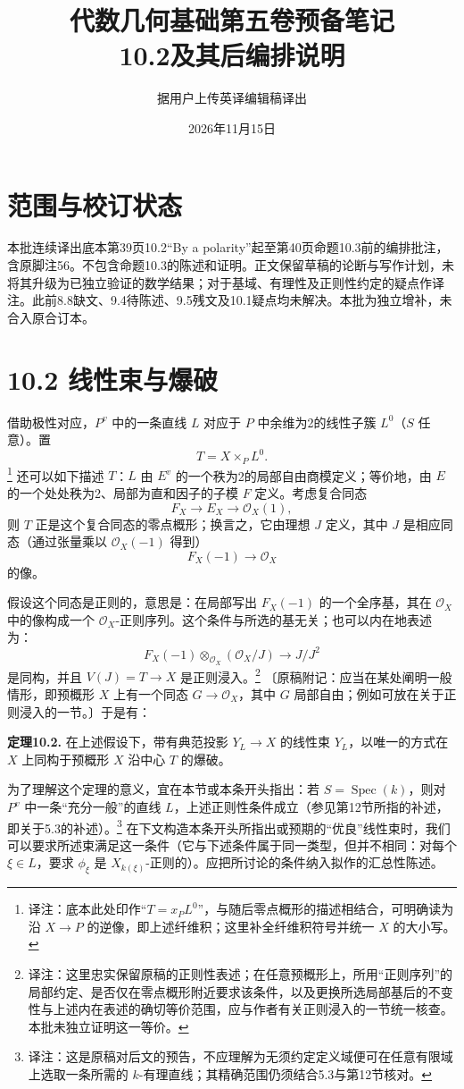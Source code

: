\documentclass[openany]{ctexbook}
\title{代数几何基础第五卷预备笔记\\10.2及其后编排说明}
\author{据用户上传英译编辑稿译出}
\date{2026年11月15日}
\newcommand{\note}[1]{\footnote{译注：#1}}
\begin{document}
\maketitle
\chapter*{范围与校订状态}
本批连续译出底本第39页10.2“By a polarity”起至第40页命题10.3前的编排批注，含原脚注56。不包含命题10.3的陈述和证明。正文保留草稿的论断与写作计划，未将其升级为已独立验证的数学结果；对于基域、有理性及正则性约定的疑点作译注。此前8.8缺文、9.4待陈述、9.5残文及10.1疑点均未解决。本批为独立增补，未合入原合订本。
\chapter*{10.2 线性束与爆破}
借助极性对应，$P^v$ 中的一条直线 $L$ 对应于 $P$ 中余维为2的线性子簇 $L^0$（$S$ 任意）。置
\[
T=X\times_P L^0.
\]
\note{底本此处印作“$T=x_P L^0$”，与随后零点概形的描述相结合，可明确读为沿 $X\to P$ 的逆像，即上述纤维积；这里补全纤维积符号并统一 $X$ 的大小写。}
还可以如下描述 $T$：$L$ 由 $E^v$ 的一个秩为2的局部自由商模定义；等价地，由 $E$ 的一个处处秩为2、局部为直和因子的子模 $F$ 定义。考虑复合同态
\[
F_X\longrightarrow E_X\longrightarrow\mathcal O_X(1),
\]
则 $T$ 正是这个复合同态的零点概形；换言之，它由理想 $J$ 定义，其中 $J$ 是相应同态（通过张量乘以 $\mathcal O_X(-1)$ 得到）
\[
F_X(-1)\longrightarrow\mathcal O_X
\]
的像。

假设这个同态是正则的，意思是：在局部写出 $F_X(-1)$ 的一个全序基，其在 $\mathcal O_X$ 中的像构成一个 $\mathcal O_X$-正则序列。这个条件与所选的基无关；也可以内在地表述为：
\[
F_X(-1)\otimes_{\mathcal O_X}(\mathcal O_X/J)
\longrightarrow J/J^2
\]
是同构，并且 $V(J)=T\to X$ 是正则浸入。\note{这里忠实保留原稿的正则性表述；在任意预概形上，所用“正则序列”的局部约定、是否仅在零点概形附近要求该条件，以及更换所选局部基后的不变性与上述内在表述的确切等价范围，应与作者有关正则浸入的一节统一核查。本批未独立证明这一等价。}
〔原稿附记：应当在某处阐明一般情形，即预概形 $X$ 上有一个同态 $G\to\mathcal O_X$，其中 $G$ 局部自由；例如可放在关于正则浸入的一节。〕于是有：

\noindent\textbf{定理10.2.}
在上述假设下，带有典范投影 $Y_L\to X$ 的线性束 $Y_L$，以唯一的方式在 $X$ 上同构于预概形 $X$ 沿中心 $T$ 的爆破。

为了理解这个定理的意义，宜在本节或本条开头指出：若 $S=\operatorname{Spec}(k)$，则对 $P^v$ 中一条“充分一般”的直线 $L$，上述正则性条件成立（参见第12节所指的补述，即关于5.3的补述）。\note{这是原稿对后文的预告，不应理解为无须约定定义域便可在任意有限域上选取一条所需的 $k$-有理直线；其精确范围仍须结合5.3与第12节核对。}
在下文构造本条开头所指出或预期的“优良”线性束时，我们可以要求所述束满足这一条件（它与下述条件属于同一类型，但并不相同：对每个 $\xi\in L$，要求 $\phi_\xi$ 是 $X_{k(\xi)}$-正则的）。应把所讨论的条件纳入拟作的汇总性陈述。
\end{document}
